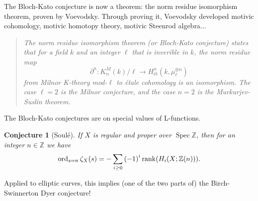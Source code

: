 \documentclass[leqno, openany]{memoir}
\newtheorem{conj}[thm]{Conjecture}
\theoremstyle{definition}
\theoremstyle{remark}
\theoremstyle{plain}
\theoremstyle{definition}
\theoremstyle{remark}
\newcommand{\Z}{\mathbb{Z}}
\DeclareMathOperator{\Spec}{Spec}
\begin{document}
The Bloch-Kato conjecture is now a theorem: the norm residue isomorphism theorem, proven by Voevodsky.  Through proving it, Voevodsky developed motivic cohomology, motivic homotopy theory, motivic Steenrod algebra... \\

\begin{quotation}
    \textit{The norm residue isomorphism theorem (or Bloch-Kato conjecture) states that for a field $k$ and an integer $\ell$ that is inverible in $k$, the norm residue map
    \[ \partial^n \colon K_n^M(k)/\ell \to H_{\text{\'et}}^n(k, \mu_{\ell}^{\otimes n}) \]
    from Milnor K-theory mod-$\ell$ to \'etale cohomology is an isomorphism. The case $\ell=2$ is the Milnor conjecture, and the case $n=2$ is the Murkurjev-Suslin theorem.} 
\end{quotation}


The Bloch-Kato conjectures are on special values of L-functions.  
\begin{conj}[Soul\'e]
    If $X$ is regular and proper over $\Spec \Z$, then for an integer $n \in \Z$ we have
    \[ \operatorname{ord}_{s=n} \zeta_X(s) = - \sum_{i \geq 0} {(-1)}^i \rank (H_i(X; \Z(n))). \]
\end{conj}


Applied to elliptic curves, this implies (one of the two parts of) the Birch-Swinnerton Dyer conjecture!
\end{document}
